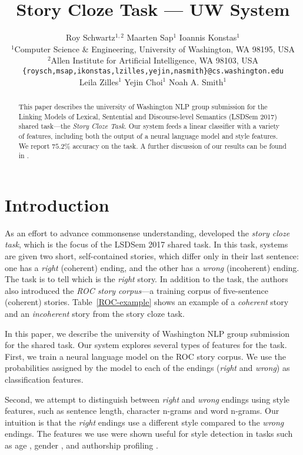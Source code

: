 \documentclass[11pt]{article}
\title{Story Cloze Task --- UW System}
\author{\hspace{2cm}Roy Schwartz$^{1,2}$ \And \hspace{2.5cm}Maarten Sap$^1$ \And \hspace{3cm}Ioannis Konstas$^1$ \And \\
  $^1$Computer Science \& Engineering, University of Washington, WA 98195, USA \\
  $^2$Allen Institute for Artificial Intelligence, WA 98103, USA \\
    {\tt \{roysch,msap,ikonstas,lzilles,yejin,nasmith\}@cs.washington.edu}  \\
    \And \hspace{-2cm}Leila Zilles$^1$ \And \hspace{-2.5cm}Yejin Choi$^1$ \And \hspace{-2.5cm}Noah A. Smith$^1$ \\
  }
\date{}
\newcommand{\ms}[1]{{\color{cyan}\{\textit{#1}\}$_{ms}$}}
\newcommand{\tabref}[1]{Table~\ref{#1}}
\begin{document}
\maketitle
\begin{abstract} %
This paper describes the university of Washington NLP group submission for the Linking Models of Lexical, Sentential and Discourse-level Semantics (LSDSem 2017) shared task---the \textit{Story Cloze Task}.
Our system feeds a linear classifier with a variety of features, including both the output of a neural language model and style features.
We report  $75.2\%$ accuracy on the task. 
A further discussion of our results can be found in \cite{Schwartz:2017}.
\end{abstract}

\section{Introduction}
As an effort to advance commonsense  understanding,  developed the \textit{story cloze task}, which is the focus of the LSDSem 2017 shared task. 
In this task, systems are given two short, self-contained stories, which differ only in their last sentence: 
one has a {\it right} (coherent) ending, and the other has a {\it wrong} (incoherent) ending.
The task is to tell which is the {\it right} story.
In addition to the task, the authors also introduced the {\it ROC story corpus}---a training corpus of five-sentence (coherent) stories. 
\tabref{ROC-example} shows an example of a {\it coherent} story and an {\it incoherent} story from the story cloze task.


In this paper, we describe the university of Washington NLP group submission for the shared task.
Our system explores several types of features for the task.
First, we train a neural language model \cite{mikolov2010recurrent} on the ROC story corpus. 
We use the probabilities assigned by the model to each of the endings ({\it right} and {\it wrong}) as classification features.

Second, we attempt to distinguish between {\it right} and {\it wrong} endings using style features, such as sentence length, character n-grams and word n-grams. 
Our intuition is that the {\it right} endings use a different style compared to the {\it wrong} endings.
The features we use were shown useful for style detection in tasks such as age \cite{Schler:2006}, gender \cite{Argamon:2003}, 
and authorship profiling \cite{Stamatatos:2009}.
\end{document}

